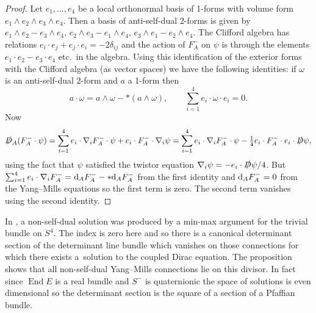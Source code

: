 \documentclass[pdftex]{sigma}
\def\End{\operatorname{End}}
\begin{document}
\begin{proof} Let $e_1,\dots, e_4$ be a local orthonormal basis of 1-forms with volume form $e_1\wedge e_2\wedge e_3\wedge e_4$. Then a basis of anti-self-dual 2-forms is given by
$e_1\wedge e_2-e_3\wedge e_4$, $e_2\wedge e_3-e_1\wedge e_4$, $e_3\wedge e_1-e_2\wedge e_4$.
The Clifford algebra has relations $e_i\cdot e_j+e_j\cdot e_i=-2\delta_{ij}$ and the action of $F_A^-$ on $\psi$ is through the elements $e_1\cdot e_2-e_3\cdot e_4$ etc.\ in the algebra. Using this identification of the exterior forms with the Clifford algebra (as vector spaces) we have the following identities: if $\omega$ is an anti-self-dual 2-form and $a$ a 1-form then
\begin{displaymath}a\cdot\omega = a\wedge \omega-\ast(a\wedge \omega),\qquad \sum_{i=1}^4e_i\cdot \omega \cdot e_i=0.\end{displaymath}
Now
\begin{displaymath}\slashed D_A(F_A^-\cdot \psi)=\sum_{i=1}^4 e_i\cdot \nabla_iF_A^-\cdot \psi +e_i\cdot F_A^-\cdot \nabla_i \psi=\sum_{i=1}^4 e_i\cdot \nabla_iF_A^-\cdot \psi -\tfrac{1}{4}e_i\cdot F_A^-\cdot e_i \cdot \slashed D\psi,\end{displaymath}
using the fact that $\psi$ satisfied the twistor equation $\nabla_i\psi=-e_i\cdot \slashed D\psi /4$.
But $\sum_{i=1}^4e_i\cdot \nabla_iF_A^-={\rm d}_AF_A^--\ast {\rm d}_AF_A^-$ from the first identity and ${\rm d}_AF_A^-=0$ from the Yang--Mills equations so the first term is zero. The second term vanishes using the second identity.
\end{proof}
\begin{remark}

 In \cite{SibnerL/SibnerR/UhlenbeckK}, a non-self-dual solution was produced by a min-max argument for the trivial bundle on $S^4$. The index is zero here and so there is a canonical determinant section of the determinant line bundle which vanishes on those connections for which there exists a~solution to the coupled Dirac equation. The proposition shows that all non-self-dual Yang--Mills connections lie on this divisor. In fact since $\End E$ is a real bundle and $S^-$ is quaternionic the space of solutions is even dimensional so the determinant section is the square of a section of a Pfaffian bundle.
\end{remark}
\end{document}
